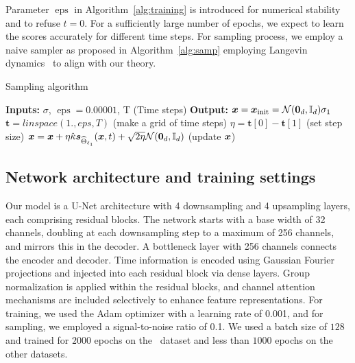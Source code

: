 Parameter $\operatorname{eps}$ in Algorithm~\ref{alg:training}  is introduced for numerical stability and to refuse $t=0$. 
For a sufficiently large number of epochs, we expect to learn the scores accurately for different time steps. 
For sampling process, we employ a naive sampler as proposed in Algorithm~\ref{alg:samp}
employing Langevin dynamics~\citep[Section~2.2]{song2019generative} to align with our theory.  
\begin{algorithm}[H]
\caption{Sampling algorithm}\label{alg:samp}
\begin{algorithmic}[1] %

\STATE \textbf{Inputs:} $\sigma$, $\operatorname{eps}=0.00001$, T (Time steps)
\STATE \textbf{Output:} \x
\STATE $\textcolor{black}{\boldsymbol{x}}=\textcolor{black}{\boldsymbol{x}}_{\operatorname{init}}=\textcolor{black}{\mathcal{N}(\boldsymbol{0}_{\textcolor{black}{d}},\mathbb{I}_{\textcolor{black}{d}})}\sigma_1$ 
\STATE $\boldsymbol{t} = linspace(1., eps, T)$ (make a grid of time steps)
\STATE $\eta = \boldsymbol{t}[0] - \boldsymbol{t}[1]$ (set step size)
\STATE $\textcolor{black}{\boldsymbol{x}}=\textcolor{black}{\boldsymbol{x}}+\eta \hat{\kappa}\textcolor{black}{\boldsymbol{s}}_{\textcolor{black}{\widehat{\textcolor{black}{\Theta}}_{\ell_1}}}(\textcolor{black}{\boldsymbol{x}},t)+\sqrt{2\eta}\textcolor{black}{\mathcal{N}(\boldsymbol{0}_{\textcolor{black}{d}},\mathbb{I}_{\textcolor{black}{d}})}$ (update $\textcolor{black}{\boldsymbol{x}}$)
\ENDFOR
\end{algorithmic}
\end{algorithm}

\subsection{Network architecture and training settings}\label{sec:netstr}
Our model is a U-Net architecture with 4 downsampling and 4 upsampling layers, each comprising residual blocks. The network starts with a base width of 32 channels, doubling at each downsampling step to a maximum of 256 channels, and mirrors this in the decoder. A bottleneck layer with 256 channels connects the encoder and decoder. Time information is encoded using Gaussian Fourier projections and injected into each residual block via dense layers. Group normalization is applied within the residual blocks, and channel attention mechanisms are included selectively to enhance feature representations.
For training, we used the Adam optimizer with a learning rate of 0.001, and for sampling, we employed a signal-to-noise ratio of 0.1.
We used a batch size of $128$ and trained for $2000$ epochs on the \ButF~dataset and less than $1000$ epochs on the other datasets.